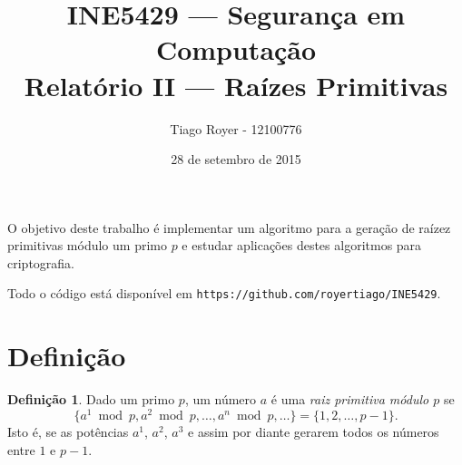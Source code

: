 \documentclass{article}
\title{
    INE5429 --- Segurança em Computação \\
    Relatório II --- Raízes Primitivas
}
\author{
    Tiago Royer - 12100776
}
\date{28 de setembro de 2015}
\theoremstyle{definition}
\newtheorem{definition}{Definição}
\begin{document}
\maketitle

O objetivo deste trabalho é implementar um algoritmo para a geração
de raízez primitivas módulo um primo $p$
e estudar aplicações destes algoritmos para criptografia.

Todo o código está disponível em \verb"https://github.com/royertiago/INE5429".

\section{Definição}

\begin{definition}
    Dado um primo $p$,
    um número $a$ é uma \emph{raiz primitiva módulo $p$}
    se
    \begin{equation*}
        \{a^1 \bmod p, a^2 \bmod p, \dots, a^n \bmod p, \dots \} = \{1, 2, \dots, p-1\}.
    \end{equation*}
    Isto é, se as potências $a^1$, $a^2$, $a^3$ e assim por diante
    gerarem todos os números entre $1$ e $p-1$.
\end{definition}
\end{document}

